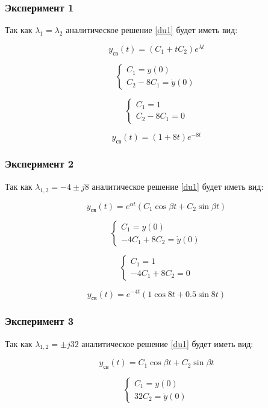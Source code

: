 \documentclass[a5paper, 10pt]{article}
\theoremstyle{definition}
\theoremstyle{plain}
\theoremstyle{remark}
\begin{document}
\subsubsection*{Эксперимент 1}

Так как $\lambda_1=\lambda_2$ аналитическое решение \ref{du1} будет иметь вид:

$$y_{\text{св}}(t)=(C_1+tC_2)e^{\lambda t}$$

$$
\begin{cases}
    C_1=y(0)\\
    C_2-8C_1=\dot{y}(0)
\end{cases}
$$

$$
\begin{cases}
    C_1=1\\
    C_2-8C_1=0
\end{cases}
$$

$$y_{\text{св}}(t)=(1+8t)e^{-8 t}$$

\subsubsection*{Эксперимент 2}

Так как $\lambda_{1,2}=-4\pm j8$ аналитическое решение \ref{du1} будет иметь вид:

$$
y_{\text{св}}(t) = e^{\alpha t} \left( C_1 \cos \beta t + C_2 \sin \beta t \right)
$$

$$
\begin{cases}
    C_1=y(0)\\
    -4C_1+8C_2=\dot{y}(0)
\end{cases}
$$

$$
\begin{cases}
    C_1=1\\
    -4C_1+8C_2=0
\end{cases}
$$

$$
y_{\text{св}}(t) = e^{-4 t} \left( 1 \cos 8 t + 0.5 \sin 8 t \right)
$$

\subsubsection*{Эксперимент 3}

Так как $\lambda_{1,2}=\pm j32$ аналитическое решение \ref{du1} будет иметь вид:

$$
y_{\text{св}}(t) = C_1 \cos \beta t + C_2 \sin \beta t
$$

$$
\begin{cases}
    C_1=y(0)\\
    32C_2=\dot{y}(0)
\end{cases}
$$
\end{document}
